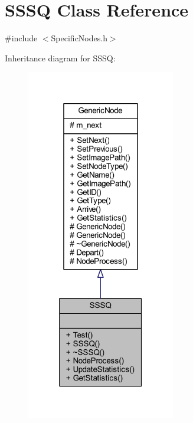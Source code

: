 \hypertarget{class_s_s_s_q}{}\section{S\+S\+SQ Class Reference}
\label{class_s_s_s_q}


{\ttfamily \#include $<$Specific\+Nodes.\+h$>$}



Inheritance diagram for S\+S\+SQ\+:
\nopagebreak
\begin{figure}[H]
\begin{center}
\leavevmode
\includegraphics[width=184pt]{class_s_s_s_q__inherit__graph}
\end{center}
\end{figure}


